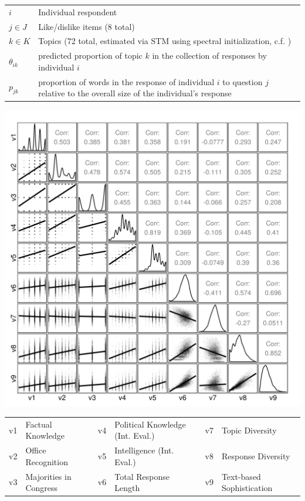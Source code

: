 \documentclass[a0,landscape]{a0poster}
\begin{document}
\begin{multicols}{4}
\begin{center}
\begin{tabular}{lp{22cm}}
\toprule 
$i$ & Individual respondent \\
$j \in J$ & Like/dislike items (8 total) \\
$k \in K$ & Topics (72 total, estimated via STM using spectral initialization, c.f. \citealt{roberts2014structural}) \\
$\theta_{ik}$ & predicted proportion of topic $k$ in the collection of responses by individual $i$\\
$p_{jk}$ & proportion of words in the response of individual $i$ to question $j$ relative to the overall size of the individual's response\\
\bottomrule
\end{tabular}
\end{center}

\begin{center}\footnotesize
\includegraphics[width=\linewidth]{../fig/corplot.png}
\begin{tabular}[ht]{llllll}
\toprule
v1 & Factual Knowledge & v4 & Political Knowledge (Int. Eval.) & v7 & Topic Diversity \\
v2 & Office Recognition & v5 & Intelligence (Int. Eval.) & v8 & Response Diversity \\
v3 & Majorities in Congress & v6 & Total Response Length &  v9 & Text-based Sophistication \\
\bottomrule
\end{tabular}
\end{center}


\end{multicols}
\end{document}
